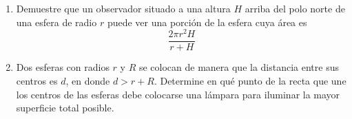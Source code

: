 \item 
    \begin{enumerate}
        \item[(a)] Demuestre que un observador situado a una altura $H$ arriba del polo norte de una esfera de radio $r$ puede ver una porción de la esfera cuya área es
        \[ \frac{2\pi r^2 H}{r + H} \]
        \item[(b)] Dos esferas con radios $r$ y $R$ se colocan de manera que la distancia entre sus centros es $d$, en donde $d > r + R$. Determine en qué punto de la recta que une los centros de las esferas debe colocarse una lámpara para iluminar la mayor superficie total posible.
    \end{enumerate}
